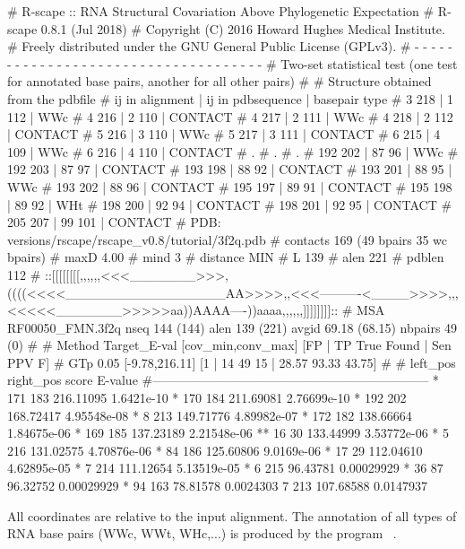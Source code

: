 \begin{sreoutput}
# R-scape :: RNA Structural Covariation Above Phylogenetic Expectation
# R-scape 0.8.1 (Jul 2018)
# Copyright (C) 2016 Howard Hughes Medical Institute.
# Freely distributed under the GNU General Public License (GPLv3).
# - - - - - - - - - - - - - - - - - - - - - - - - - - - - - - - - - - - -
# Two-set statistical test (one test for annotated base pairs, another for all other pairs)
#
# Structure obtained from the pdbfile
# ij in alignment | ij in pdbsequence | basepair type
# 3 218 | 1 112 | WWc
# 4 216 | 2 110 | CONTACT
# 4 217 | 2 111 | WWc
# 4 218 | 2 112 | CONTACT
# 5 216 | 3 110 | WWc
# 5 217 | 3 111 | CONTACT
# 6 215 | 4 109 | WWc
# 6 216 | 4 110 | CONTACT
# .
# .
# .
# 192 202 | 87 96 | WWc
# 192 203 | 87 97 | CONTACT
# 193 198 | 88 92 | CONTACT
# 193 201 | 88 95 | WWc
# 193 202 | 88 96 | CONTACT
# 195 197 | 89 91 | CONTACT
# 195 198 | 89 92 | WHt
# 198 200 | 92 94 | CONTACT
# 198 201 | 92 95 | CONTACT
# 205 207 | 99 101 | CONTACT
# PDB:      versions/rscape/rscape_v0.8/tutorial/3f2q.pdb
# contacts  169 (49 bpairs 35 wc bpairs)
# maxD      4.00
# mind      3
# distance  MIN
# L         139
# alen      221
# pdblen    112
# ::[[[[[[[[,,,,,,<<<_______>>>,((((<<<<_________________AA>>>>,,<<<----------<____>>>>,,,<<<<<_______>>>>>aa))AAAA----))aaaa,,,,,,]]]]]]]]::
# MSA RF00050_FMN.3f2q nseq 144 (144) alen 139 (221) avgid 69.18 (68.15) nbpairs 49 (0)
#
# Method Target_E-val [cov_min,conv_max] [FP | TP True Found | Sen PPV F] 
# GTp    0.05         [-9.78,216.11]     [1 | 14 49 15 | 28.57 93.33 43.75] 
#
#       left_pos       right_pos        score           E-value
#------------------------------------------------------------------
*	     171	     183	216.11095	1.6421e-10
*	     170	     184	211.69081	2.76699e-10
*	     192	     202	168.72417	4.95548e-08
*	       8	     213	149.71776	4.89982e-07
*	     172	     182	138.66664	1.84675e-06
*	     169	     185	137.23189	2.21548e-06
**	      16	      30	133.44999	3.53772e-06
*	       5	     216	131.02575	4.70876e-06
*	      84	     186	125.60806	9.0169e-06
*	      17	      29	112.04610	4.62895e-05
*	       7	     214	111.12654	5.13519e-05
*	       6	     215	96.43781	0.00029929
*	      36	      87	96.32752	0.00029929
*	      94	     163	78.81578	0.0024303
 	       7	     213	107.68588	0.0147937
\end{sreoutput}

\noindent
All coordinates are relative to the input alignment. The annotation of
all types of RNA base pairs (WWc, WWt, WHc,...) is produced by the
program ~\citep{YangWesthof03}.

